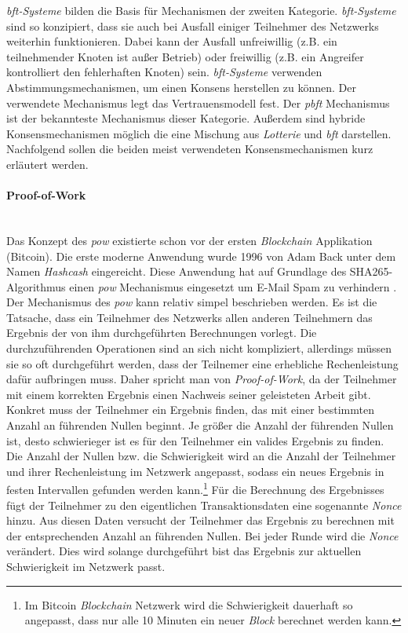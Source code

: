 \textit{\acf{bft}-Systeme} bilden die Basis für Mechanismen der zweiten Kategorie. \textit{\ac{bft}-Systeme} sind so konzipiert, dass sie auch bei Ausfall einiger Teilnehmer des Netzwerks weiterhin funktionieren. Dabei kann der Ausfall unfreiwillig (z.B. ein teilnehmender Knoten ist außer Betrieb) oder freiwillig (z.B. ein Angreifer kontrolliert den fehlerhaften Knoten) sein. \textit{\ac{bft}-Systeme} verwenden Abstimmungsmechanismen, um einen Konsens herstellen zu können. Der verwendete Mechanismus legt das Vertrauensmodell fest. Der \textit{\acf{pbft}} Mechanismus ist der bekannteste Mechanismus dieser Kategorie.
Außerdem sind hybride Konsensmechanismen möglich die eine Mischung aus \textit{Lotterie} und \textit{\ac{bft}} darstellen. Nachfolgend sollen die beiden meist verwendeten Konsensmechanismen kurz erläutert werden.

\paragraph{Proof-of-Work}$~~$\\
Das Konzept des \textit{\acf{pow}} existierte schon vor der ersten \textit{Blockchain} Applikation (Bitcoin). Die erste moderne Anwendung wurde 1996 von Adam Back unter dem Namen \textit{Hashcash} eingereicht. Diese Anwendung hat auf Grundlage des SHA265-Algorithmus einen \textit{\ac{pow}} Mechanismus eingesetzt um E-Mail Spam zu verhindern \citep{Back2002}. Der Mechanismus des \textit{\ac{pow}} kann relativ simpel beschrieben werden. Es ist die Tatsache, dass ein Teilnehmer des Netzwerks allen anderen Teilnehmern das Ergebnis der von ihm durchgeführten Berechnungen vorlegt. Die durchzuführenden Operationen sind an sich nicht kompliziert, allerdings müssen sie so oft durchgeführt werden, dass der Teilnemer eine erhebliche Rechenleistung dafür aufbringen muss. Daher spricht man von \textit{Proof-of-Work}, da der Teilnehmer mit einem korrekten Ergebnis einen Nachweis seiner geleisteten Arbeit gibt. Konkret muss der Teilnehmer ein Ergebnis finden, das mit einer bestimmten Anzahl an führenden Nullen beginnt. Je größer die Anzahl der führenden Nullen ist, desto schwierieger ist es für den Teilnehmer ein valides Ergebnis zu finden. Die Anzahl der Nullen bzw. die Schwierigkeit wird an die Anzahl der Teilnehmer und ihrer Rechenleistung im Netzwerk angepasst, sodass ein neues Ergebnis in festen Intervallen gefunden werden kann.\footnote{Im Bitcoin \textit{Blockchain} Netzwerk wird die Schwierigkeit dauerhaft so angepasst, dass nur alle 10 Minuten ein neuer \textit{Block} berechnet werden kann.} Für die Berechnung des Ergebnisses fügt der Teilnehmer zu den eigentlichen Transaktionsdaten eine sogenannte \textit{Nonce} hinzu. Aus diesen Daten versucht der Teilnehmer das Ergebnis zu berechnen mit der entsprechenden Anzahl an führenden Nullen. Bei jeder Runde wird die \textit{Nonce} verändert. Dies wird solange durchgeführt bist das Ergebnis zur aktuellen Schwierigkeit im Netzwerk passt.

